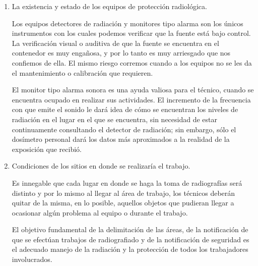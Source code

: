 

\begin{enumerate}
         \item [c)] La existencia y estado de los equipos de protección radiológica.

    Los equipos detectores de radiación y monitores tipo alarma son los únicos instrumentos con los cuales podemos verificar que la fuente está bajo control. La verificación visual o auditiva de que la fuente se encuentra en el contenedor es muy engañosa, y por lo tanto es muy arriesgado que nos confiemos de ella. El mismo riesgo corremos cuando a los equipos no se les da el mantenimiento o calibración que requieren.

    El monitor tipo alarma sonora es una ayuda valiosa para el técnico, cuando se encuentra ocupado en realizar sus actividades. El incremento de la frecuencia con que emite el sonido le dará idea de cómo se encuentran los niveles de radiación en el lugar en el que se encuentra, sin necesidad de estar continuamente consultando el detector de radiación; sin embargo, sólo el dosímetro personal dará los datos más aproximados a la realidad de la exposición que recibió.

    \item [d)] Condiciones de los sitios en donde se realizaría el trabajo.

    Es innegable que cada lugar en donde se haga la toma de radiografías será distinto y por lo mismo al llegar al área de trabajo, los técnicos deberán quitar de la misma, en lo posible, aquellos objetos que pudieran llegar a ocasionar algún problema al equipo o durante el trabajo.

    El objetivo fundamental de la delimitación de las áreas, de la notificación de que se efectúan trabajos de radiografiado y de la notificación de seguridad es el adecuado manejo de la radiación y la protección de todos los trabajadores involucrados.
\end{enumerate}
